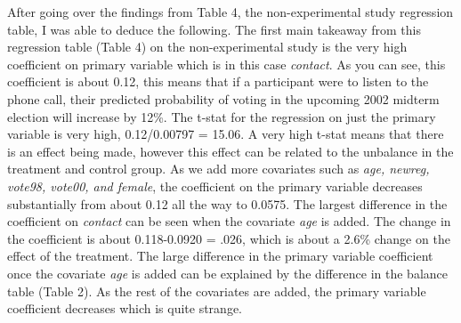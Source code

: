 \documentclass[a4paper]{article}
\begin{document}
\begin{flushleft}

After going over the findings from Table 4, the non-experimental study regression table, I was able to deduce the following. The first main takeaway from this regression table (Table 4) on the non-experimental study is the very high coefficient on primary variable which is in this case \textit{contact}. As you can see, this coefficient is about 0.12, this means that if a participant were to listen to the phone call, their predicted probability of voting in the upcoming 2002 midterm election will increase by 12\%. The t-stat for the regression on just the primary variable is very high, 0.12/0.00797 = 15.06. A very high t-stat means that there is an effect being made, however this effect can be related to the unbalance in the treatment and control group. As we add more covariates such as \textit{age, newreg, vote98, vote00, and female}, the coefficient on the primary variable decreases substantially from about 0.12 all the way to 0.0575. The largest difference in the coefficient on \textit{contact} can be seen when the covariate \textit{age} is added. The change in the coefficient is about 0.118-0.0920 = .026, which is about a 2.6\% change on the effect of the treatment. The large difference in the primary variable coefficient once the covariate \textit{age} is added can be explained by the difference in the balance table (Table 2). As the rest of the covariates are added, the primary variable coefficient decreases which is quite strange.
\end{flushleft}
\end{document}
